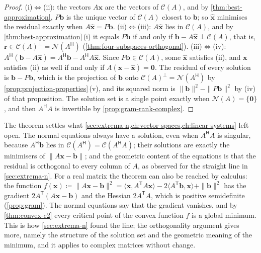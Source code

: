 \begin{proof}
(i)$\Leftrightarrow$(ii): the vectors $A\mathbf x$ are the vectors of $\mathcal C(A)$, and by \cref{thm:best-approximation}, $P\mathbf b$ is the unique vector of $\mathcal C(A)$ closest to $\mathbf b$; so $\hat{\mathbf x}$ minimises the residual exactly when $A\hat{\mathbf x}=P\mathbf b$. (ii)$\Leftrightarrow$(iii): $A\hat{\mathbf x}$ lies in $\mathcal C(A)$, and by \cref{thm:best-approximation}\,(i) it equals $P\mathbf b$ if and only if $\mathbf b-A\hat{\mathbf x}\perp\mathcal C(A)$, that is, $\mathbf r\in\mathcal C(A)^\perp=\mathcal N(A^{\mathsf H})$ (\cref{thm:four-subspaces-orthogonal}). (iii)$\Leftrightarrow$(iv): $A^{\mathsf H}(\mathbf b-A\hat{\mathbf x})=A^{\mathsf H}\mathbf b-A^{\mathsf H}A\hat{\mathbf x}$. Since $P\mathbf b\in\mathcal C(A)$, some $\hat{\mathbf x}$ satisfies (ii), and $\mathbf x$ satisfies (ii) as well if and only if $A(\mathbf x-\hat{\mathbf x})=\mathbf 0$. The residual of every solution is $\mathbf b-P\mathbf b$, which is the projection of $\mathbf b$ onto $\mathcal C(A)^\perp=\mathcal N(A^{\mathsf H})$ by \cref{prop:projection-properties}\,(v), and its squared norm is $\|\mathbf b\|^2-\|P\mathbf b\|^2$ by (iv) of that proposition. The solution set is a single point exactly when $\mathcal N(A)=\{\mathbf 0\}$, and then $A^{\mathsf H}A$ is invertible by \cref{prop:gram-rank-complex}.
\end{proof}

The theorem settles what \cref{sec:extrema-n,ch:vector-spaces,ch:linear-systems} left open. The normal equations always have a solution, even when $A^{\mathsf H}A$ is singular, because $A^{\mathsf H}\mathbf b$ lies in $\mathcal C(A^{\mathsf H})=\mathcal C(A^{\mathsf H}A)$; their solutions are exactly the minimisers of $\|A\mathbf x-\mathbf b\|$; and the geometric content of the equations is that the residual is orthogonal to every column of $A$, as observed for the straight line in \cref{sec:extrema-n}. For a real matrix the theorem can also be reached by calculus: the function $f(\mathbf x)\coloneqq\|A\mathbf x-\mathbf b\|^2=\langle\mathbf x,A^{\mathsf T}A\mathbf x\rangle-2\langle A^{\mathsf T}\mathbf b,\mathbf x\rangle+\|\mathbf b\|^2$ has the gradient $2A^{\mathsf T}(A\mathbf x-\mathbf b)$ and the Hessian $2A^{\mathsf T}A$, which is positive semidefinite (\cref{prop:gram}). The normal equations say that the gradient vanishes, and by \cref{thm:convex-c2} every critical point of the convex function $f$ is a global minimum. This is how \cref{sec:extrema-n} found the line; the orthogonality argument gives more, namely the structure of the solution set and the geometric meaning of the minimum, and it applies to complex matrices without change.


